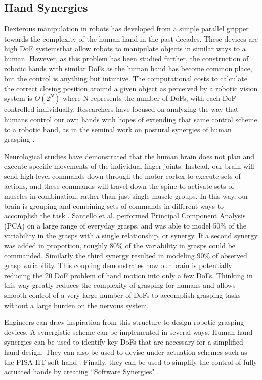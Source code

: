 \documentclass[runningheads,a4paper]{llncs}
\begin{document}
\subsection{Hand Synergies}
	Dexterous manipulation in robots has developed from a simple parallel gripper towards the complexity of the human hand in the past decades. These devices are high DoF systemsthat allow robots to manipulate objects in similar ways to a human. However, as this problem has been studied further, the construction of robotic hands with similar DoFs as the human hand has become common place, but the control is anything but intuitive. The computational costs to calculate the correct closing position around a given object as perceived by a robotic vision system is $O(2^N)$
 where N represents the number of DoFs, with each DoF controlled individually. Researchers have focused on analyzing the way that humans control our own hands with hopes of extending that same control scheme to a robotic hand, as in the seminal work on postural synergies of human grasping \cite{Santello}. 

Neurological studies have demonstrated that the human brain does not plan and execute specific movements of the individual finger joints. Instead, our brain will send high level commands down through the motor cortex to execute sets of actions, and these commands will travel down the spine to activate sets of muscles in combination, rather than just single muscle groups. In this way, our brain is grouping and combining sets of commands in different ways to accomplish the task \cite{neuro}.  Santello et al. performed Principal Component Analysis (PCA) on a large range of everyday grasps, and was able to model 50$\%$ of the variability in the grasps with a single relationship, or synergy. If a second synergy was added in proportion, roughly 80$\%$  of the variability in grasps could be commanded. Similarly the third synergy resulted in modeling 90$\%$  of observed grasp variability. This coupling demonstrates how our brain is potentially reducing the 20 DoF problem of hand motion into only a few DoFs. Thinking in this way greatly reduces the complexity of grasping for humans and allows smooth control of a very large number of DoFs to accomplish grasping  tasks without a large burden on the nervous system. 

 Engineers can draw inspiration from this structure to design robotic grasping devices.  A synergistic scheme can be implemented in several ways.  Human hand synergies can be used to identify key DoFs that are necessary for a simplified hand design.  They can also be used to devise under-actuation schemes such as the PISA-IIT soft-hand \cite{softhand}.  Finally, they can be used to simplify the control of fully actuated hands by creating ``Software Synergies" \cite{catalano_2012_adaptive}.  
\end{document}
